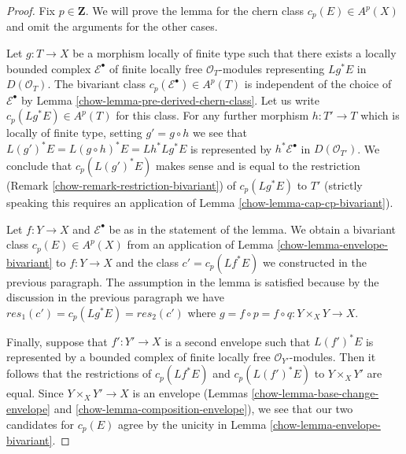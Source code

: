 \begin{proof}

Fix $p \in \mathbf{Z}$. We will prove the lemma for the chern
class $c_p(E) \in A^p(X)$ and omit the arguments for the other cases.

\medskip\noindent
Let $g : T \to X$ be a morphism locally of finite type such that
there exists a locally bounded complex $\mathcal{E}^\bullet$ of finite locally
free $\mathcal{O}_T$-modules representing $Lg^*E$ in $D(\mathcal{O}_T)$.
The bivariant class $c_p(\mathcal{E}^\bullet) \in A^p(T)$
is independent of the choice of $\mathcal{E}^\bullet$ by
Lemma \ref{chow-lemma-pre-derived-chern-class}.
Let us write $c_p(Lg^*E) \in A^p(T)$ for this class.
For any further morphism $h : T' \to T$ which is locally
of finite type, setting $g' = g \circ h$ we see that
$L(g')^*E = L(g \circ h)^*E = Lh^*Lg^*E$ is represented by
$h^*\mathcal{E}^\bullet$ in $D(\mathcal{O}_{T'})$.
We conclude that $c_p(L(g')^*E)$ makes sense and is equal to the
restriction (Remark \ref{chow-remark-restriction-bivariant})
of $c_p(Lg^*E)$ to $T'$ (strictly speaking this requires an application of
Lemma \ref{chow-lemma-cap-cp-bivariant}).

\medskip\noindent
Let $f : Y \to X$ and $\mathcal{E}^\bullet$ be as in the statement
of the lemma. We obtain a bivariant class $c_p(E) \in A^p(X)$ from
an application of Lemma \ref{chow-lemma-envelope-bivariant}
to $f : Y \to X$ and the class $c' = c_p(Lf^*E)$ we constructed
in the previous paragraph. The assumption in the lemma is
satisfied because by the discussion in the previous paragraph we have
$res_1(c') = c_p(Lg^*E) = res_2(c')$ where
$g = f \circ p = f \circ q : Y \times_X Y \to X$.

\medskip\noindent
Finally, suppose that $f' : Y' \to X$ is a second envelope
such that $L(f')^*E$ is represented by a bounded complex of
finite locally free $\mathcal{O}_{Y'}$-modules. Then it follows
that the restrictions of $c_p(Lf^*E)$ and $c_p(L(f')^*E)$
to $Y \times_X Y'$ are equal. Since $Y \times_X Y' \to X$
is an envelope (Lemmas \ref{chow-lemma-base-change-envelope} and
\ref{chow-lemma-composition-envelope}), we see that our two candidates for $c_p(E)$
agree by the unicity in Lemma \ref{chow-lemma-envelope-bivariant}.
\end{proof}

